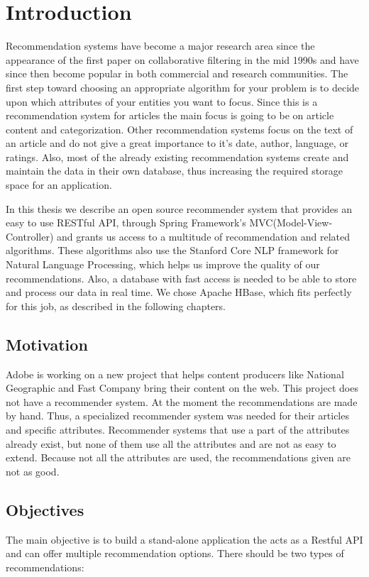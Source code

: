 \chapter{Introduction}
\label{chapter:intro}

Recommendation systems have become a major research area\cite{evaluate-recommender-system} since the appearance of the first paper on collaborative filtering in the mid 1990s and have since then become popular in both commercial and research communities. The first step toward choosing an appropriate algorithm for your problem is to decide upon which attributes of your entities you want to focus. Since this is a recommendation system for articles the main focus is going to be on article content and categorization. Other recommendation systems focus on the text of an article and do not give a great importance to it's date, author, language, or ratings. Also, most of the already existing recommendation systems create and maintain the data in their own database, thus increasing the required storage space for an application. 

In this thesis we describe an open source recommender system that provides an easy to use RESTful API, through Spring Framework's MVC(Model-View-Controller) and grants us access to a multitude of recommendation and related algorithms. These algorithms also use the Stanford Core NLP framework for Natural Language Processing, which helps us improve the quality of our recommendations. Also, a database with fast access is needed to be able to store and process our data in real time. We chose Apache HBase, which fits perfectly for this job, as described in the following chapters.

\section{Motivation}
\label{sec:motivation}
Adobe is working on a new project that helps content producers like National Geographic and Fast Company bring their content on the web. This project does not have a recommender system. At the moment the recommendations are made by hand. Thus, a specialized recommender system was needed for their articles and specific attributes. Recommender systems that use a part of the attributes already exist, but none of them use all the attributes and are not as easy to extend. Because not all the attributes are used, the recommendations given are not as good.

\section{Objectives}
\label{sec:objectives}
The main objective is to build a stand-alone application the acts as a Restful API and can offer multiple recommendation options. There should be two types of recommendations:

